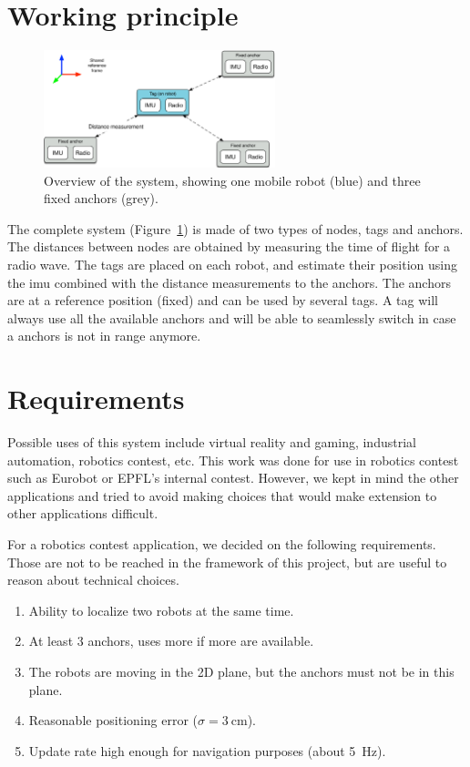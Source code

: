 \documentclass[a4paper, 12pt]{scrreprt}
\begin{document}
\section{Working principle}

\begin{figure}[h!]
    \centering
    \includegraphics[width=0.6\textwidth]{figures/system.pdf}
    \caption{Overview of the system, showing one mobile robot (blue) and three fixed anchors (grey).}
    \label{fig:system}
\end{figure}

The complete system (Figure~\ref{fig:system}) is made of two types of nodes, tags and anchors.
The distances between nodes are obtained by measuring the time of flight for a radio wave.
The tags are placed on each robot, and estimate their position using the \gls{imu} combined with the distance measurements to the anchors.
The anchors are at a reference position (fixed) and can be used by several tags.
A tag will always use all the available anchors and will be able to seamlessly switch in case a anchors is not in range anymore.

\section{Requirements}

Possible uses of this system include virtual reality and gaming, industrial automation, robotics contest, etc.
This work was done for use in robotics contest such as Eurobot or EPFL's internal contest.
However, we kept in mind the other applications and tried to avoid making choices that would make extension to other applications difficult.

For a robotics contest application, we decided on the following requirements.
Those are not to be reached in the framework of this project, but are useful to reason about technical choices.

\begin{enumerate}
    \item Ability to localize two robots at the same time.
    \item At least 3 anchors, uses more if more are available.
    \item The robots are moving in the 2D plane, but the anchors must not be in this plane.
    \item Reasonable positioning error ($\sigma=\SI{3}{\centi\meter}$).
    \item Update rate high enough for navigation purposes (about \SI{5}{\hertz}).
\end{enumerate}
\end{document}
